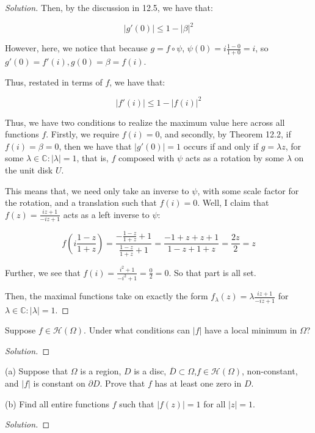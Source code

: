 \documentclass[10pt]{article}
\newenvironment{problem}[2][]{\begin{trivlist}
\item[\hskip \labelsep {\bfseries #1}\hskip \labelsep {\bfseries #2.}]}{\end{trivlist}}
\begin{document}
\begin{proof}[Solution]
Then, by the discussion in 12.5, we have that:

$$ |g'(0)| \leq 1 - | \beta |^2 $$

However, here, we notice that because $g = f \circ \psi$, $\psi(0) = i \frac{ 1 - 0}{ 1+ 0} = i$, so $g'(0) = f'(i), g(0) = \beta = f(i)$. 

Thus, restated in terms of $f$, we have that:

$$ |f'(i)| \leq 1 - | f(i)|^2 $$

Thus, we have two conditions to realize the maximum value here across all functions $f$. Firstly, we require $f(i) = 0$, and secondly, by Theorem 12.2, if $f(i)= \beta = 0$, then we have that $|g'(0)|  = 1$ occurs if and only if $g = \lambda z$, for some $\lambda \in \mathbb{C} : | \lambda | = 1$, that is, $f$ composed with $\psi$ acts as a rotation by some $\lambda$ on the unit disk $U$. 

This means that, we need only take an inverse to $\psi$, with some scale factor for the rotation, and a translation such that $f(i) = 0$. Well, I claim that $f(z) = \frac{iz + 1}{-iz + 1}$ acts as a left inverse to $\psi$:

$$ f\left(i \frac{1-z}{1+z}\right) = \frac{- \frac{1-z}{1+z} + 1}{ \frac{1-z}{1+z} +1} = \frac{ -1 + z + z + 1}{ 1-z + 1 + z} = \frac{2z}{2} = z$$

Further, we see that $f(i) = \frac{i^2 + 1}{-i^2 + 1} = \frac{0}{2} = 0$. So that part is all set.

Then, the maximal functions take on exactly the form $f_\lambda(z) = \lambda  \frac{iz + 1}{-iz + 1}$ for $\lambda \in \mathbb{C} : |\lambda| = 1$. 

\end{proof}

\begin{problem}{Question 4}

Suppose $f \in \mathcal{H}(\Omega)$. Under what conditions can $|f|$ have a local minimum in $\Omega$?

\end{problem}
 
\begin{proof}[Solution]

\end{proof}
  

\begin{problem}{Question 5}

(a) Suppose that $\Omega$ is a region, $D$ is a disc, $\overline{D} \subset \Omega$,$f \in \mathcal{H}(\Omega)$, non-constant, and $|f|$ is constant on $\partial D$. Prove that $f$ has at least one zero in $D$. 

(b) Find all entire functions $f$ such that $|f(z)|  =1 $ for all $|z| = 1$. 

\end{problem}

\begin{proof}[Solution]

\end{proof}
\end{document}

